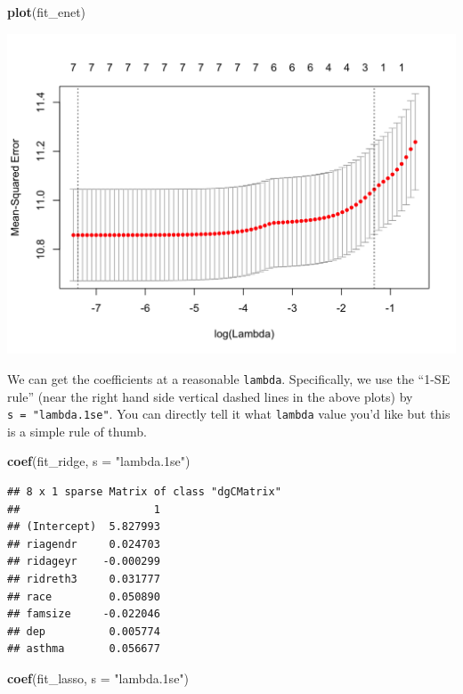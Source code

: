 \documentclass[]{tufte-book}
\newenvironment{Shaded}{}{}
\newcommand{\KeywordTok}[1]{\textcolor[rgb]{0.00,0.44,0.13}{\textbf{#1}}}
\newcommand{\DataTypeTok}[1]{\textcolor[rgb]{0.56,0.13,0.00}{#1}}
\newcommand{\StringTok}[1]{\textcolor[rgb]{0.25,0.44,0.63}{#1}}
\newcommand{\NormalTok}[1]{#1}
\theoremstyle{definition}
\theoremstyle{definition}
\theoremstyle{remark}
\begin{document}
\begin{Shaded}
\begin{Highlighting}[]
\KeywordTok{plot}\NormalTok{(fit_enet)}
\end{Highlighting}
\end{Shaded}

\includegraphics{_main_files/figure-latex/unnamed-chunk-107-3}

We can get the coefficients at a reasonable \texttt{lambda}.
Specifically, we use the ``1-SE rule'' (near the right hand side
vertical dashed lines in the above plots) by
\texttt{s\ =\ "lambda.1se"}. You can directly tell it what
\texttt{lambda} value you'd like but this is a simple rule of thumb.

\begin{Shaded}
\begin{Highlighting}[]
\KeywordTok{coef}\NormalTok{(fit_ridge, }\DataTypeTok{s =} \StringTok{"lambda.1se"}\NormalTok{)}
\end{Highlighting}
\end{Shaded}

\begin{verbatim}
## 8 x 1 sparse Matrix of class "dgCMatrix"
##                     1
## (Intercept)  5.827993
## riagendr     0.024703
## ridageyr    -0.000299
## ridreth3     0.031777
## race         0.050890
## famsize     -0.022046
## dep          0.005774
## asthma       0.056677
\end{verbatim}

\begin{Shaded}
\begin{Highlighting}[]
\KeywordTok{coef}\NormalTok{(fit_lasso, }\DataTypeTok{s =} \StringTok{"lambda.1se"}\NormalTok{)}
\end{Highlighting}
\end{Shaded}
\end{document}
